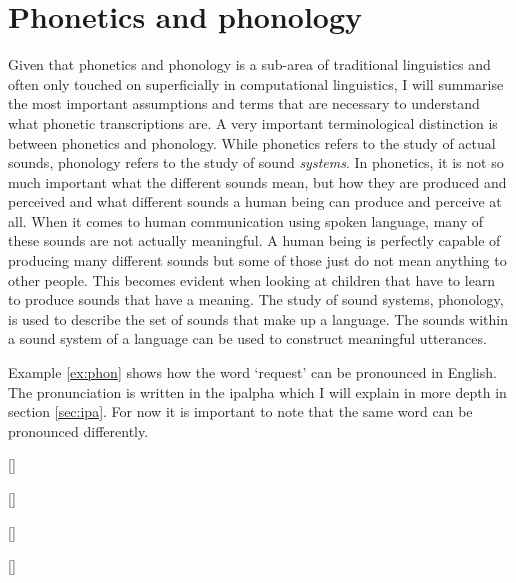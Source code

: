 \section{Phonetics and phonology}
\label{phonetics}
Given that phonetics and phonology is a sub-area of traditional linguistics and often only touched on superficially in computational linguistics, I will summarise the most important assumptions and terms that are necessary to understand what phonetic transcriptions are.
A very important terminological distinction is between phonetics and phonology. While phonetics refers to the study of actual sounds, phonology refers to the study of sound \textit{systems}. In phonetics, it is not so much important what the different sounds mean, but how they are produced and perceived and what different sounds a human being can produce and perceive at all. When it comes to human communication using spoken language, many of these sounds are not actually meaningful. A human being is perfectly capable of producing many different sounds but some of those just do not mean anything to other people. This becomes evident when looking at children that have to learn to produce sounds that have a meaning. The study of sound systems, phonology, is used to describe the set of sounds that make up a language. The sounds within a sound system of a language can be used to construct meaningful utterances. 

Example \ref{ex:phon} shows how the word `request' can be pronounced in English. The pronunciation is written in the \ac{ipalpha} which I will explain in more depth in section \ref{sec:ipa}. For now it is important to note that the same word can be pronounced differently.

\begin{covsubexamples}[preamble={Different pronunciations of the English word `request'. Note that example (d) is a incorrect pronunciation:}] \label{ex:phon}
\item \label{ex:phonetics} [] %
\item \label{ex:phonetics2} [] %
\item \label{ex:phonetics3} [] %
\item \label{ex:phonetics4} [] %
\end{covsubexamples}

